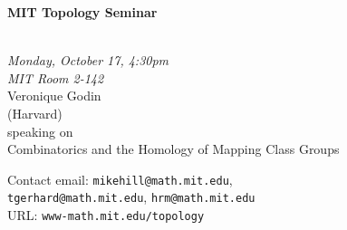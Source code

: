 \documentclass{slides}
\begin{document}
\begin{center}

{\fontsize {54pt}{40pt}\selectfont

\textrm{
{\textbf{MIT Topology Seminar}}}
}\\
\vspace{1cm}
{\large\textrm{\emph{Monday, October 17, 4:30pm\\MIT Room 2-142}}}\\
\vspace{1cm}
\textrm{{\LARGE Veronique Godin  \\[.5cm](Harvard)}}\\
\vspace{1cm} %
\textrm{speaking on}\\ %
\vspace{5mm}
\textrm{{\LARGE Combinatorics and the Homology of Mapping Class Groups}}\\
\end{center}
\vspace{1cm}


\textrm{Contact email: } \texttt{mikehill@math.mit.edu}, 
\\ \texttt{tgerhard@math.mit.edu}, \texttt{hrm@math.mit.edu}\\
\textrm{URL: } \texttt{www-math.mit.edu/topology}
\end{document}

